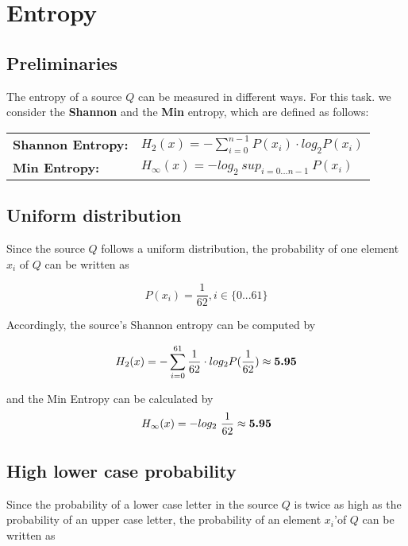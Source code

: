 

\renewcommand\thesubsection{\alph{subsection})}





\section{Entropy}

\subsection*{Preliminaries}

The entropy of a source $Q$ can be measured in different ways. For this task. we consider the \textbf{Shannon} and the \textbf{Min} entropy, which are defined as follows:

\begin{tabular}{ll}
  \textbf{Shannon Entropy:} & $H_2(x)= -\displaystyle\sum_{i=0}^{n-1}P(x_i)\cdot log_2 P(x_i)$ \\
  \textbf{Min Entropy:} & $H_{\infty}(x)= -log_2\ sup_{i=0...n-1}\ P(x_i)$
\end{tabular}

\subsection{Uniform distribution}

Since the source $Q$ follows a uniform distribution, the probability of one element $x_i$ of $Q$ can be written as

$$
P(x_i) = \frac{1}{62}, i \in \{0...61\}
$$

Accordingly, the source's Shannon entropy can be computed by

$$
H_2(x) = -\displaystyle\sum_{i=0}^{61}\frac{1}{62}\cdot log_2 P(\frac{1}{62})
\approx \text{\textbf{5.95}}
$$

and the Min Entropy can be calculated by
$$
H_{\infty}(x)= -log_2\ \frac{1}{62}
\approx \text{\textbf{5.95}}
$$

\subsection{High lower case probability}

Since the probability of a lower case letter in the source $Q$ is twice as high as the probability of an upper case letter, the probability of an element $x_i$'of $Q$ can be written as

